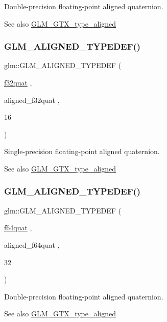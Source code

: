 Double-\/precision floating-\/point aligned quaternion. \begin{DoxySeeAlso}{See also}
\mbox{\hyperlink{group__gtx__type__aligned}{G\+L\+M\+\_\+\+G\+T\+X\+\_\+type\+\_\+aligned}} 
\end{DoxySeeAlso}
\mbox{\label{group__gtx__type__aligned_ga1ed8aeb5ca67fade269a46105f1bf273}} 
\subsubsection{\texorpdfstring{GLM\_ALIGNED\_TYPEDEF()}{GLM\_ALIGNED\_TYPEDEF()}\hspace{0.1cm}{\footnotesize\ttfamily [208/209]}}
{\footnotesize\ttfamily glm\+::\+G\+L\+M\+\_\+\+A\+L\+I\+G\+N\+E\+D\+\_\+\+T\+Y\+P\+E\+D\+EF (\begin{DoxyParamCaption}\item[{\mbox{\hyperlink{group__gtc__type__precision_gac59c4d798396552e4bbb866b3d8a2f18}{f32quat}}}]{,  }\item[{aligned\+\_\+f32quat}]{,  }\item[{16}]{ }\end{DoxyParamCaption})}

Single-\/precision floating-\/point aligned quaternion. \begin{DoxySeeAlso}{See also}
\mbox{\hyperlink{group__gtx__type__aligned}{G\+L\+M\+\_\+\+G\+T\+X\+\_\+type\+\_\+aligned}} 
\end{DoxySeeAlso}
\mbox{\label{group__gtx__type__aligned_ga95cc03b8b475993fa50e05e38e203303}} 
\subsubsection{\texorpdfstring{GLM\_ALIGNED\_TYPEDEF()}{GLM\_ALIGNED\_TYPEDEF()}\hspace{0.1cm}{\footnotesize\ttfamily [209/209]}}
{\footnotesize\ttfamily glm\+::\+G\+L\+M\+\_\+\+A\+L\+I\+G\+N\+E\+D\+\_\+\+T\+Y\+P\+E\+D\+EF (\begin{DoxyParamCaption}\item[{\mbox{\hyperlink{group__gtc__type__precision_ga5b54d7b36fbee5e271f73e6ed74e7172}{f64quat}}}]{,  }\item[{aligned\+\_\+f64quat}]{,  }\item[{32}]{ }\end{DoxyParamCaption})}

Double-\/precision floating-\/point aligned quaternion. \begin{DoxySeeAlso}{See also}
\mbox{\hyperlink{group__gtx__type__aligned}{G\+L\+M\+\_\+\+G\+T\+X\+\_\+type\+\_\+aligned}} 
\end{DoxySeeAlso}
